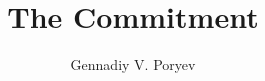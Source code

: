 \documentclass[a4paper,12pt,twoside]{book}
\begin{document}
%
%
\pagestyle{empty}
\title{\textbf{The Commitment}}
\author{
Gennadiy V. Poryev
}
\date{}
\maketitle
%
%
\pagestyle{fancy}
\fancyhf{}
\lhead[]{\thepage}
\rhead[\thepage]{}
\linespread{1.2}
%
%

%
%
\newpage
\renewcommand{\cftchapdotsep}{\cftdotsep}
\tableofcontents
\newpage
\thispagestyle{empty}
%
%

%

%

%
%
%
%
\end{document}
